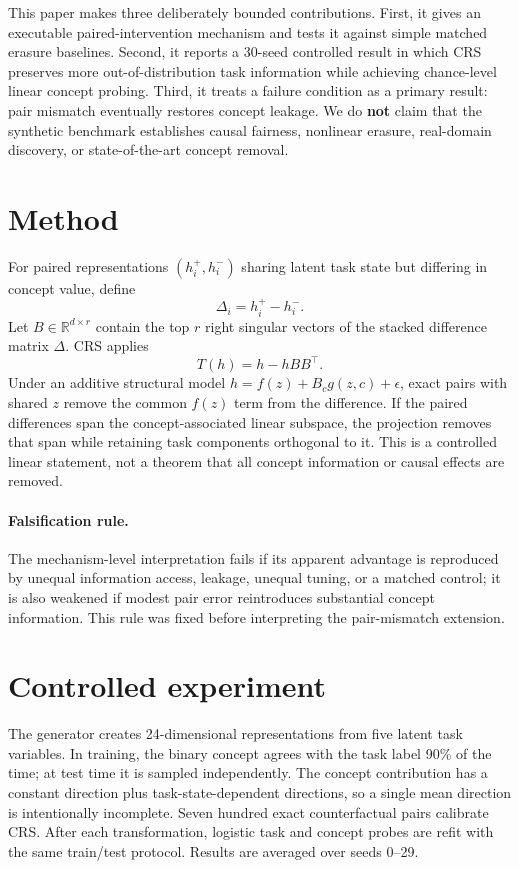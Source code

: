 \documentclass{article}
\begin{document}
This paper makes three deliberately bounded contributions. First, it gives an executable paired-intervention mechanism and tests it against simple matched erasure baselines. Second, it reports a 30-seed controlled result in which CRS preserves more out-of-distribution task information while achieving chance-level linear concept probing. Third, it treats a failure condition as a primary result: pair mismatch eventually restores concept leakage. We do \textbf{not} claim that the synthetic benchmark establishes causal fairness, nonlinear erasure, real-domain discovery, or state-of-the-art concept removal.

\section{Method}
For paired representations $(h_i^+,h_i^-)$ sharing latent task state but differing in concept value, define
\[
\Delta_i = h_i^+ - h_i^-.
\]
Let $B\in\mathbb{R}^{d\times r}$ contain the top $r$ right singular vectors of the stacked difference matrix $\Delta$. CRS applies
\[
T(h)=h-hBB^\top.
\]
Under an additive structural model $h=f(z)+B_c g(z,c)+\epsilon$, exact pairs with shared $z$ remove the common $f(z)$ term from the difference. If the paired differences span the concept-associated linear subspace, the projection removes that span while retaining task components orthogonal to it. This is a controlled linear statement, not a theorem that all concept information or causal effects are removed.

\paragraph{Falsification rule.}
The mechanism-level interpretation fails if its apparent advantage is reproduced by unequal information access, leakage, unequal tuning, or a matched control; it is also weakened if modest pair error reintroduces substantial concept information. This rule was fixed before interpreting the pair-mismatch extension.

\section{Controlled experiment}
The generator creates 24-dimensional representations from five latent task variables. In training, the binary concept agrees with the task label 90\% of the time; at test time it is sampled independently. The concept contribution has a constant direction plus task-state-dependent directions, so a single mean direction is intentionally incomplete. Seven hundred exact counterfactual pairs calibrate CRS. After each transformation, logistic task and concept probes are refit with the same train/test protocol. Results are averaged over seeds 0--29.
\end{document}
